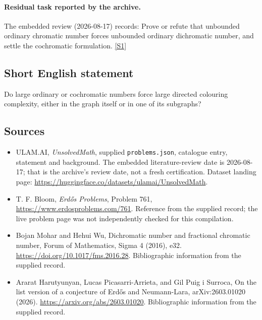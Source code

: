 \documentclass[11pt,a4paper]{article}
\newcommand{\sref}[2]{\hyperlink{source:#1:#2}{[S#2]}}
\begin{document}
\paragraph{Residual task reported by the archive.}

The embedded review (2026-08-17) records: Prove or refute that unbounded ordinary chromatic number forces unbounded ordinary dichromatic number, and settle the cochromatic formulation. \sref{statement}{1}

\subsection{Short English statement}

Do large ordinary or cochromatic numbers force large directed colouring complexity, either in the graph itself or in one of its subgraphs?

\subsection{Sources}

{\small

\begin{itemize}

\item[\hypertarget{source:statement:1}{S1}] ULAM.AI, \emph{UnsolvedMath}, supplied \texttt{problems.json}, catalogue entry, statement and background. The embedded literature-review date is 2026-08-17; that is the archive’s review date, not a fresh certification. Dataset landing page: \url{https://huggingface.co/datasets/ulamai/UnsolvedMath}.

\item[\hypertarget{source:statement:2}{S2}] T. F. Bloom, \emph{Erdős Problems}, Problem 761, \url{https://www.erdosproblems.com/761}. Reference from the supplied record; the live problem page was not independently checked for this compilation.

\item[\hypertarget{source:statement:3}{S3}] Bojan Mohar and Hehui Wu, Dichromatic number and fractional chromatic number, Forum of Mathematics, Sigma 4 (2016), e32. \url{https://doi.org/10.1017/fms.2016.28}. Bibliographic information from the supplied record.

\item[\hypertarget{source:statement:4}{S4}] Ararat Harutyunyan, Lucas Picasarri-Arrieta, and Gil Puig i Surroca, On the list version of a conjecture of Erdős and Neumann-Lara, arXiv:2603.01020 (2026). \url{https://arxiv.org/abs/2603.01020}. Bibliographic information from the supplied record.

\end{itemize}

}

\label{end:statement}
\end{document}
